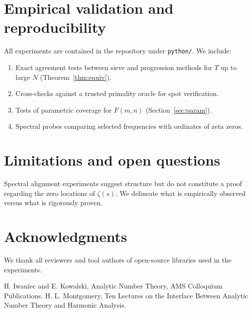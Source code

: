 \documentclass[11pt]{article}
\theoremstyle{definition}
\theoremstyle{remark}
\begin{document}
\section{Empirical validation and reproducibility}
All experiments are contained in the repository under \texttt{python/}. We include:
\begin{enumerate}[leftmargin=*]
  \item Exact agreement tests between sieve and progression methods for \(T\) up to large \(N\) (Theorem~\ref{thm:equiv}).
  \item Cross-checks against a trusted primality oracle for spot verification.
  \item Tests of parametric coverage for \(F(m,n)\) (Section~\ref{sec:param}).
  \item Spectral probes comparing selected frequencies with ordinates of zeta zeros.
\end{enumerate}

\section{Limitations and open questions}
Spectral alignment experiments suggest structure but do not constitute a proof regarding the zero locations of \(\zeta(s)\). We delineate what is empirically observed versus what is rigorously proven.

\section*{Acknowledgments}
We thank all reviewers and tool authors of open-source libraries used in the experiments.


\begin{thebibliography}{9}
 H. Iwaniec and E. Kowalski, Analytic Number Theory, AMS Colloquium Publications.
 H. L. Montgomery, Ten Lectures on the Interface Between Analytic Number Theory and Harmonic Analysis.
\end{thebibliography}
\end{document}
